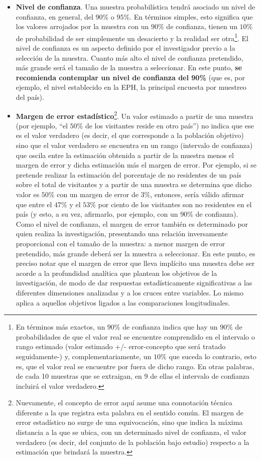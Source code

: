 \documentclass[
]{book}
\begin{document}
\begin{itemize}
\item
  \textbf{Nivel de confianza}. Una muestra probabilística tendrá asociado un nivel de confianza, en general, del \(90\%\) o \(95\%\). En términos simples, esto significa que los valores arrojados por la muestra con un \(90\%\) de confianza, tienen un \(10\%\) de probabilidad de ser simplemente un desacierto y la realidad ser otra\footnote{En términos más exactos, un \(90\%\) de confianza indica que hay un \(90\%\) de probabilidades de que el valor real se encuentre comprendido en el intervalo o rango estimado (valor estimado +/- error-concepto que será tratado seguidamente-) y, complementariamente, un \(10\%\) que suceda lo contrario, esto es, que el valor real se encuentre por fuera de dicho rango. En otras palabras, de cada 10 muestras que se extraigan, en 9 de ellas el intervalo de confianza incluirá el valor verdadero.}. El nivel de confianza es un aspecto definido por el investigador previo a la selección de la muestra. Cuanto más alto el nivel de confianza pretendido, más grande será el tamaño de la muestra a seleccionar. En este punto, \textbf{se recomienda contemplar un nivel de confianza del 90\%} (que es, por ejemplo, el nivel establecido en la EPH, la principal encuesta por muestreo del país).
\item
  \textbf{Margen de error estadístico}\footnote{Nuevamente, el concepto de error aquí asume una connotación técnica diferente a la que registra esta palabra en el sentido común. El margen de error estadístico no surge de una equivocación, sino que indica la máxima distancia a la que se ubica, con un determinado nivel de confianza, el valor verdadero (es decir, del conjunto de la población bajo estudio) respecto a la estimación que brindará la muestra.}. Un valor estimado a partir de una muestra (por ejemplo, ``el \(50\%\) de los visitantes reside en otro país'') no indica que ese es el valor verdadero (es decir, el que corresponde a la población objetivo) sino que el valor verdadero se encuentra en un rango (intervalo de confianza) que oscila entre la estimación obtenida a partir de la muestra menos el margen de error y dicha estimación más el margen de error. Por ejemplo, si se pretende realizar la estimación del porcentaje de no residentes de un país sobre el total de visitantes y a partir de una muestra se determina que dicho valor es \(50\%\) con un margen de error de \(3\%\), entonces, sería válido afirmar que entre el \(47\%\) y el \(53\%\) por ciento de los visitantes son no residentes en el país (y esto, a su vez, afirmarlo, por ejemplo, con un \(90\%\) de confianza). Como el nivel de confianza, el margen de error también es determinado por quien realiza la investigación, presentando una relación inversamente proporcional con el tamaño de la muestra: a menor margen de error pretendido, más grande deberá ser la muestra a seleccionar. En este punto, es preciso notar que el margen de error que lleva implícito una muestra debe ser acorde a la profundidad analítica que plantean los objetivos de la investigación, de modo de dar respuestas estadísticamente significativas a las diferentes dimensiones analizadas y a los cruces entre variables. Lo mismo aplica a aquellos objetivos ligados a las comparaciones longitudinales.

\end{itemize}
\end{document}
